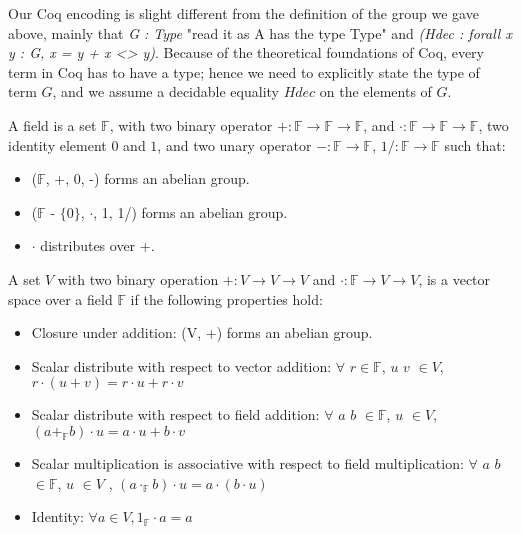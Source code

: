 \noindent
Our Coq encoding is slight different from the definition of the group we gave above, mainly that \textit{G : Type} "read it as A has the type Type" and 
\textit{(Hdec : forall x y : G, {x = y} + {x <> y})}. Because of the theoretical foundations of Coq, every term in Coq has to have a type;
hence we need to explicitly state the type of term $G$, and we assume a decidable equality $Hdec$ on the elements of $G$.  

\begin{definition}[Field] 
A field  is a set $\mathbb{F}$, with two binary operator $+ : \mathbb{F} \rightarrow \mathbb{F} \rightarrow \mathbb{F}$,  and $\cdot : \mathbb{F} \rightarrow \mathbb{F} \rightarrow \mathbb{F}$, 
two identity element $0$ and $1$, and two unary operator $- : \mathbb{F} \rightarrow \mathbb{F}$, $1/ : \mathbb{F} \rightarrow \mathbb{F}$  such that:
\end{definition} 
 \begin{itemize}
 \item ($\mathbb{F}$, +, 0, -) forms an abelian group.
 \item ($\mathbb{F}$ - $\lbrace 0 \rbrace$, $\cdot$, 1, 1/) forms an abelian group.
 \item $\cdot$ distributes over +.
 \end{itemize}
 
 

\begin{definition}
A set $V$ with two binary operation $+ : V \rightarrow V \rightarrow V$ and $\cdot : \mathbb{F}  \rightarrow V \rightarrow V$, 
is  a vector space over a field $\mathbb{F}$ if the following properties hold:
\end{definition} 
\begin{itemize}
 \item Closure under addition: (V, +) forms an abelian group. 
 \item Scalar  distribute  with respect  to  vector  addition: $\forall$  $r \in \mathbb{F}$, $u$ $v$ $\in V$,  $r \cdot (u + v) = r \cdot u + r \cdot v$
 \item Scalar distribute with respect to field addition: 
                $\forall$  $a$ $b$ $\in \mathbb{F}$, $u$ $\in V$, $(a +_{\mathbb{F}} b) \cdot u = a \cdot u + b \cdot v$
  \item Scalar multiplication is associative with respect to field multiplication:
         $\forall$ $a$ $b$ $\in  \mathbb{F}$, $u$ $\in V$ , $(a \cdot_{\mathbb{F}} b) \cdot u = a \cdot (b \cdot u)$
  \item Identity: $\forall a \in V, 1_{\mathbb{F}} \cdot a = a$

\end{itemize}



